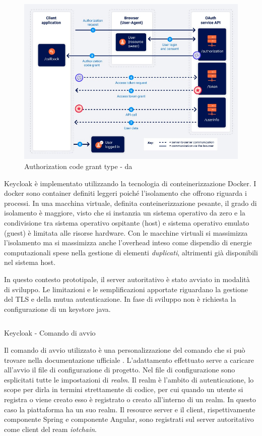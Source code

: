 \documentclass[a4paper,11pt]{article}
\begin{document}
\begin{figure}[H]
  \includegraphics[width=1\linewidth]{img/oauth-authorization-code-flow.jpg}
  \caption{Authorization code grant type - da \cite{portswiggerOAuthGrant}}
  \label{fig:flussoportswigger}
\end{figure}

Keycloak è implementato utilizzando la tecnologia di conteinerizzazione Docker. I docker sono container definiti leggeri poiché l'isolamento che offrono riguarda i processi. In una macchina virtuale, definita conteinerizzazione pesante, il grado di isolamento è maggiore, visto che si instanzia un sistema operativo da zero e la condivisione tra sistema operativo ospitante (host) e sistema operativo emulato (guest) è limitata alle risorse hardware. Con le macchine virtuali si massimizza l'isolamento ma si massimizza anche l'overhead inteso come dispendio di energie computazionali spese nella gestione di elementi \textit{duplicati}, altrimenti già disponibili nel sistema host. \cite{dockerWhatContainer}

In questo contesto prototipale, il server autoritativo è stato avviato in modalità di sviluppo. Le limitazioni e le semplificazioni apportate riguardano la gestione del TLS e della mutua autenticazione. In fase di sviluppo non è richiesta la configurazione di un keystore java.

\begin{listing}
  \inputminted{bash}{./code/avvio.kc.sh}
  \caption{Keycloak - Comando di avvio}
  \label{listing:avviokc}
\end{listing}

Il comando di avvio utilizzato è una personalizzazione del comando che si può trovare nella documentazione ufficiale \cite{keycloakDockerKeycloak}. L'adattamento effettuato serve a caricare all'avvio il file di configurazione di progetto. Nel file di configurazione sono esplicitati tutte le impostazioni di \textit{realm}. Il realm è l'ambito di autenticazione, lo scope per dirla in termini strettamente di codice, per cui quando un utente si registra o viene creato esso è registrato o creato all'interno di un realm. In questo caso la piattaforma ha un suo realm. Il resource server e il client, rispettivamente componente Spring e componente Angular, sono registrati sul server autoritativo come client del ream \textit{iotchain}.
\end{document}
